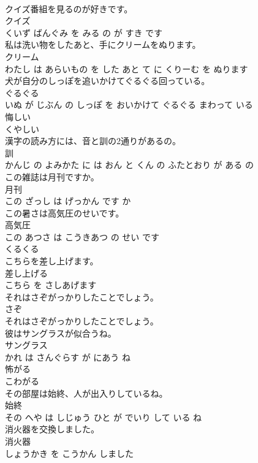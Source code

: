 \documentclass[8pt]{extreport}
\begin{document}
\begin{CJK}{UTF8}{min}
\\	クイズ番組を見るのが好きです。	
\\	クイズ 
\\	くいず ばんぐみ を みる の が すき です			
\\	私は洗い物をしたあと、手にクリームをぬります。	
\\	クリーム 
\\	わたし は あらいもの を した あと て に くりーむ を ぬります			
\\	犬が自分のしっぽを追いかけてぐるぐる回っている。	
\\	ぐるぐる 
\\	いぬ が じぶん の しっぽ を おいかけて ぐるぐる まわって いる			
\\	悔しい	
\\	くやしい			
\\	漢字の読み方には、音と訓の2通りがあるの。	
\\	訓 
\\	かんじ の よみかた に は おん と くん の ふたとおり が ある の			
\\	この雑誌は月刊ですか。	
\\	月刊 
\\	この ざっし は げっかん です か			
\\	この暑さは高気圧のせいです。	
\\	高気圧 
\\	この あつさ は こうきあつ の せい です			
\\	くるくる	
\\	こちらを差し上げます。	
\\	差し上げる 
\\	こちら を さしあげます			
\\	それはさぞがっかりしたことでしょう。	
\\	さぞ 
\\	それはさぞがっかりしたことでしょう。			
\\	彼はサングラスが似合うね。	
\\	サングラス 
\\	かれ は さんぐらす が にあう ね			
\\	怖がる	
\\	こわがる			
\\	その部屋は始終、人が出入りしているね。	
\\	始終 
\\	その へや は しじゅう ひと が でいり して いる ね			
\\	消火器を交換しました。	
\\	消火器 
\\	しょうかき を こうかん しました			

\end{CJK}
\end{document}
